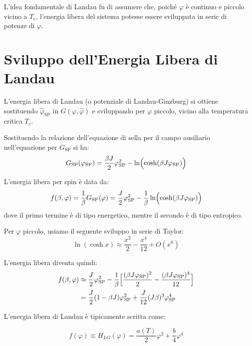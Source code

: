 L'idea fondamentale di Landau fu di assumere che, poiché $\varphi$ è continuo e piccolo vicino a $T_c$, l'energia libera del sistema potesse essere sviluppata in serie di potenze di $\varphi$.

\section{Sviluppo dell'Energia Libera di Landau}
L'energia libera di Landau (o potenziale di Landau-Ginzburg) si ottiene sostituendo $\hat{\varphi}_{\text{SP}}$ in $G(\varphi, \hat{\varphi})$ e sviluppando per $\varphi$ piccolo, vicino alla temperatura critica $T_c$.

Sostituendo la relazione dell'equazione di sella per il campo ausiliario nell'equazione per $G_{\text{SP}}$ si ha:
\begin{equation}
G_{\text{SP}}(\varphi_{\text{SP}}) = \frac{\beta J}{2}\varphi_{\text{SP}}^{2}-\ln \Bigl(\cosh(\beta J \varphi_{\text{SP}}) \Bigr)
\end{equation}

L'energia libera per spin è data da:
\begin{equation}
f(\beta,\varphi) = \frac{1}{\beta} G_{\text{SP}}(\varphi) = \frac{J}{2}\varphi_{\text{SP}}^{2}-\frac{1}{\beta} \ln \Bigl(\cosh(\beta J \varphi_{\text{SP}}) \Bigr)
\end{equation}
dove il primo termine è di tipo energetico, mentre il secondo è di tipo entropico.

Per $\varphi$ piccolo, usiamo il seguente sviluppo in serie di Taylor:
\begin{equation} 
\ln(\cosh x) \approx \frac{x^2}{2} - \frac{x^4}{12} + O(x^6) 
\end{equation}

L'energia libera diventa quindi:
\begin{align}
f(\beta,\varphi) &\approx \frac{J}{2}\varphi_{\text{SP}}^{2}-\frac{1}{\beta} \Bigl[ \frac{(\beta J \varphi_{\text{SP}})^2 }{2}-\frac{(\beta J \varphi_{\text{SP}})^4 }{12}\Bigr] \nonumber \\ 
&= \frac{J}{2}(1 - \beta J)\varphi_{\text{SP}}^{2} + \frac{J}{12} (J \beta)^3 \varphi_{\text{SP}}^{4}
\end{align}

L'energia libera di Landau è tipicamente scritta come:
\begin{tcolorbox}[
    colback=colorA!5,      
    colframe=colorA,       
    arc=3mm,               
    boxrule=1.2pt
]
\begin{equation}
f(\varphi)\equiv H_{LG}(\varphi) = \frac{a(T)}{2}\varphi^{2}+\frac{b}{4}\varphi^{4}
\label{eq:landau_ginzburg_pot}
\end{equation}
\end{tcolorbox}

